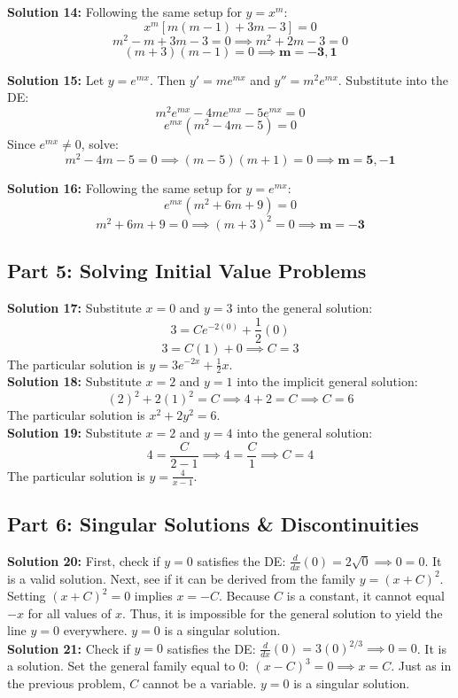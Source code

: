 \documentclass[12pt]{article}
\begin{document}
\noindent \textbf{Solution 14:} Following the same setup for $y = x^m$:
$$x^m [m(m-1) + 3m - 3] = 0$$
$$m^2 - m + 3m - 3 = 0 \implies m^2 + 2m - 3 = 0$$
$$(m+3)(m-1) = 0 \implies \mathbf{m = -3, 1}$$

\noindent \textbf{Solution 15:} Let $y = e^{mx}$. Then $y' = m e^{mx}$ and $y'' = m^2 e^{mx}$. Substitute into the DE:
$$m^2 e^{mx} - 4m e^{mx} - 5 e^{mx} = 0$$
$$e^{mx}(m^2 - 4m - 5) = 0$$
Since $e^{mx} \neq 0$, solve:
$$m^2 - 4m - 5 = 0 \implies (m-5)(m+1) = 0 \implies \mathbf{m = 5, -1}$$

\noindent \textbf{Solution 16:} Following the same setup for $y = e^{mx}$:
$$e^{mx}(m^2 + 6m + 9) = 0$$
$$m^2 + 6m + 9 = 0 \implies (m+3)^2 = 0 \implies \mathbf{m = -3}$$

\subsection*{Part 5: Solving Initial Value Problems}
\textbf{Solution 17:} Substitute $x = 0$ and $y = 3$ into the general solution:
$$3 = C e^{-2(0)} + \frac{1}{2}(0)$$
$$3 = C(1) + 0 \implies C = 3$$
The particular solution is $y = 3e^{-2x} + \frac{1}{2}x$. \\

\noindent \textbf{Solution 18:} Substitute $x = 2$ and $y = 1$ into the implicit general solution:
$$(2)^2 + 2(1)^2 = C \implies 4 + 2 = C \implies C = 6$$
The particular solution is $x^2 + 2y^2 = 6$. \\

\noindent \textbf{Solution 19:} Substitute $x = 2$ and $y = 4$ into the general solution:
$$4 = \frac{C}{2 - 1} \implies 4 = \frac{C}{1} \implies C = 4$$
The particular solution is $y = \frac{4}{x-1}$.

\subsection*{Part 6: Singular Solutions \& Discontinuities}
\textbf{Solution 20:} First, check if $y=0$ satisfies the DE: $\frac{d}{dx}(0) = 2\sqrt{0} \implies 0 = 0$. It is a valid solution. Next, see if it can be derived from the family $y = (x+C)^2$. Setting $(x+C)^2 = 0$ implies $x = -C$. Because $C$ is a constant, it cannot equal $-x$ for all values of $x$. Thus, it is impossible for the general solution to yield the line $y=0$ everywhere. $y=0$ is a singular solution. \\

\noindent \textbf{Solution 21:} Check if $y=0$ satisfies the DE: $\frac{d}{dx}(0) = 3(0)^{2/3} \implies 0=0$. It is a solution. Set the general family equal to 0: $(x-C)^3 = 0 \implies x = C$. Just as in the previous problem, $C$ cannot be a variable. $y=0$ is a singular solution. \\
\end{document}

